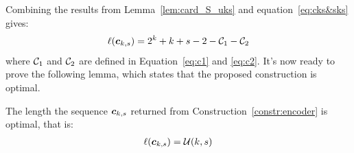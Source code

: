 Combining the results from Lemma~\ref{lem:card_S_uks} and equation~\ref{eq:cks&sks} gives: 
\begin{align*}
    \ell({\boldsymbol c}_{k,s}) = 2^{k}+k+s-2-{\cal C}_{1}-{\cal C}_{2}
\end{align*}
where ${\cal C}_{1}$ and ${\cal C}_{2}$ are defined in Equation~\ref{eq:c1} and \ref{eq:c2}. It's now ready to prove the following lemma, which states that the proposed construction is optimal.
\begin{lemma}\label{lemma:2_length_equal}
    The length the sequence ${\boldsymbol c}_{k,s}$ returned from Construction~\ref{constr:encoder} is optimal, that is:
    \begin{align}
        \ell({\boldsymbol c}_{k,s}) = \mathcal{U}(k,s) \label{eq:equals_lowerbound}
    \end{align}
\end{lemma}
